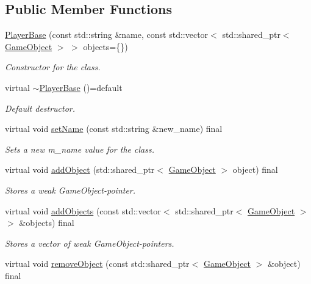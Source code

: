 \subsection*{Public Member Functions}
\begin{DoxyCompactItemize}
\item 
\hyperlink{classCourse_1_1PlayerBase_a6a0c8d316a63aedd52b8de7e19a1ca58}{Player\-Base} (const std\-::string \&name, const std\-::vector$<$ std\-::shared\-\_\-ptr$<$ \hyperlink{classCourse_1_1GameObject}{Game\-Object} $>$ $>$ objects=\{\})
\begin{DoxyCompactList}\small\item\em Constructor for the class. \end{DoxyCompactList}\item 
virtual \hyperlink{classCourse_1_1PlayerBase_a03a96c594802234264f687f981a4d1e7}{$\sim$\-Player\-Base} ()=default
\begin{DoxyCompactList}\small\item\em Default destructor. \end{DoxyCompactList}\item 
virtual void \hyperlink{classCourse_1_1PlayerBase_a15433e03022021d7ea002f3283be5de8}{set\-Name} (const std\-::string \&new\-\_\-name) final
\begin{DoxyCompactList}\small\item\em Sets a new m\-\_\-name value for the class. \end{DoxyCompactList}\item 
virtual void \hyperlink{classCourse_1_1PlayerBase_afc810bbdf7f879458ac125cc06e462d9}{add\-Object} (std\-::shared\-\_\-ptr$<$ \hyperlink{classCourse_1_1GameObject}{Game\-Object} $>$ object) final
\begin{DoxyCompactList}\small\item\em Stores a weak Game\-Object-\/pointer. \end{DoxyCompactList}\item 
virtual void \hyperlink{classCourse_1_1PlayerBase_a01e8c70b87440b2b9229bb3a779e599c}{add\-Objects} (const std\-::vector$<$ std\-::shared\-\_\-ptr$<$ \hyperlink{classCourse_1_1GameObject}{Game\-Object} $>$ $>$ \&objects) final
\begin{DoxyCompactList}\small\item\em Stores a vector of weak Game\-Object-\/pointers. \end{DoxyCompactList}\item 
virtual void \hyperlink{classCourse_1_1PlayerBase_a1d3ccf57f7d582db179d2f63504a2f79}{remove\-Object} (const std\-::shared\-\_\-ptr$<$ \hyperlink{classCourse_1_1GameObject}{Game\-Object} $>$ \&object) final

\end{DoxyCompactItemize}
